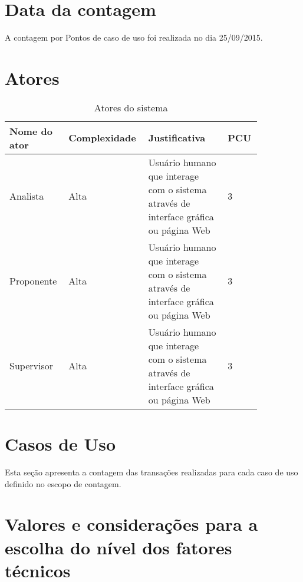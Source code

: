 \section{Data da contagem}
  
  A contagem por Pontos de caso de uso foi realizada no dia 25/09/2015.

\section{Atores}

\begin{table*}[!h]
\centering
\caption{Atores do sistema}
\label{Rotulo}
  \begin{tabular}{|p{0.20\linewidth}|p{0.25\linewidth}|p{0.30\linewidth}|p{0.10\linewidth}|}
  \hline
  \textbf{Nome do ator} & \textbf{Complexidade} & \textbf{Justificativa} & \textbf{PCU} \\ 
  \hline

  Analista & Alta & Usuário humano que interage com o sistema através de interface gráfica ou página Web& 3 \\
  \hline
  Proponente & Alta & Usuário humano que interage com o sistema através de interface gráfica ou página Web& 3\\
  \hline
  Supervisor & Alta & Usuário humano que interage com o sistema através de interface gráfica ou página Web& 3\\
  \hline
  \end{tabular}
\end{table*}

\section{Casos de Uso}
  
  Esta seção apresenta a contagem das transações realizadas para cada caso de uso definido no escopo de contagem.

  
  
  
\vfill
\pagebreak

\section{Valores e considerações para a escolha do nível dos fatores técnicos}
  
